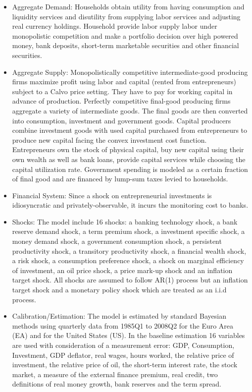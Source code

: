 \documentclass[11pt,a4paper]{article}
\begin{document}
	\begin{itemize}
		\item Aggregate Demand: Households obtain utility from having consumption and liquidity services and disutility from supplying labor services and adjusting real currency holdings. Household provide labor supply labor under monopolistic competition and make a portfolio decision over high powered money, bank deposits, short-term marketable securities and other financial securities.
		\item Aggregate Supply: Monopolistically competitive intermediate-good producing firms maximize profit using labor and capital (rented from entrepreneurs) subject to a Calvo price setting. They have to pay for working capital in advance of production. Perfectly competitive final-good producing firms aggregate a variety of intermediate goods. The final goods are then converted into consumption, investment and government goods. Capital producers combine investment goods with used capital purchased from entrepreneurs to produce new capital facing the convex investment cost function. Entrepreneurs own the stock of physical capital, buy new capital using their own wealth as well as bank loans, provide capital services while choosing the capital utilization rate. Government spending is modeled as a certain fraction of final good and are financed by lump-sum taxes levied to households.
		\item Financial System: Since a shock on entrepreneurial investments is idiosyncratic and privately-observable, it incurs the monitoring cost to banks.
		
		\item Shocks: The model include 16 shocks: a banking technology shock, a bank reserve demand shock, a term premium shock, a investment specific shock, a money demand shock, a government consumption shock, a persistent productivity shock, a transitory productivity shock, a financial wealth shock, a risk shock, a consumption preference shock, a shock on marginal efficiency of investment, an oil price shock, a price mark-up shock and an inflation target shock. All shocks are assumed to follow AR(1) process but an inflation target shock and a monetary policy shock which are treated as an i.i.d process.
		\item Calibration/Estimation: The model is estimated by standard Bayesian methods using quarterly data from 1985Q1 to 2008Q2 for the Euro Area (EA) and for the United States (US). In the baseline estimation 16 variables are used with consideration of a measurement error: GDP, Consumption, Investment, GDP deflator, real wages, hours worked, the relative price of investment, the relative price of oil, the short-term interest rate, the stock market, a measure of the external finance premium, real credit, two definitions of real money growth, bank reserves and the term spread.
	\end{itemize}
	
\end{document}

